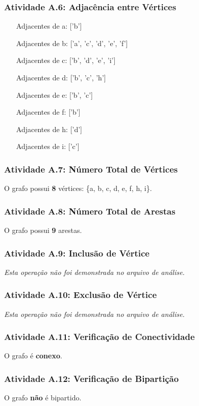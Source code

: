 \documentclass[a4paper,12pt]{article}
\begin{document}
\subsubsection*{Atividade A.6: Adjacência entre Vértices}
\begin{itemize}[align=left, leftmargin=40pt, labelsep=1em]
    \item[Adjacentes de a:] ['b']
    \item[Adjacentes de b:] ['a', 'c', 'd', 'e', 'f']
    \item[Adjacentes de c:] ['b', 'd', 'e', 'i']
    \item[Adjacentes de d:] ['b', 'c', 'h']
    \item[Adjacentes de e:] ['b', 'c']
    \item[Adjacentes de f:] ['b']
    \item[Adjacentes de h:] ['d']
    \item[Adjacentes de i:] ['c']
\end{itemize}

\subsubsection*{Atividade A.7: Número Total de Vértices}
O grafo possui \textbf{8} vértices: \{a, b, c, d, e, f, h, i\}.

\subsubsection*{Atividade A.8: Número Total de Arestas}
O grafo possui \textbf{9} arestas.

\subsubsection*{Atividade A.9: Inclusão de Vértice}
\textit{Esta operação não foi demonstrada no arquivo de análise.}

\subsubsection*{Atividade A.10: Exclusão de Vértice}
\textit{Esta operação não foi demonstrada no arquivo de análise.}

\subsubsection*{Atividade A.11: Verificação de Conectividade}
O grafo é \textbf{conexo}.

\subsubsection*{Atividade A.12: Verificação de Bipartição}
O grafo \textbf{não} é bipartido.
\end{document}
